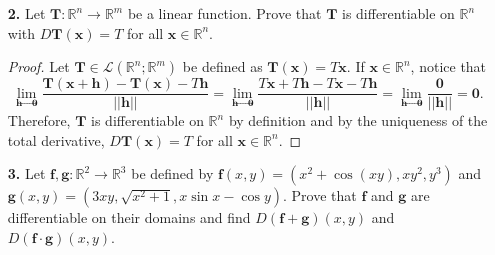 \documentclass[ 12pt ]{article}
\begin{document}
\begin{enumerate}
		\begin{proof}
			Let $f, g : \mathbb{R} \to \mathbb{R}$ be functions such that $f, g : \mathcal{C}^1(-1, 1)$. Furthermore, let $h(x, y) = f(x)g(y)$. For any $(x, y) \in (-1, 1)^2$, observe
			that $$\frac{\partial h}{\partial x}(x, y) = g(y) \frac{\partial f}{\partial x}(x)\;\;\; \mathrm{and}\;\;\; \frac{\partial h}{\partial y}(x, y) = f(x) \frac{\partial g}{
			\partial y}(y)$$ are both continuous as a result of our lemma and so $h \in \mathcal{C}^1(-1, 1)^2$. Then by Theorem 11.15, $h$ is differentiable on $(-1, 1)^2$.
		\end{proof}


	\item[\textbf{2.}] Let $\textbf{T} : \mathbb{R}^n \to \mathbb{R}^m$ be a linear function. Prove that $\textbf{T}$ is differentiable on $\mathbb{R}^n$ with $D\textbf{T}(\textbf{x}) =
		T$ for all $\textbf{x} \in \mathbb{R}^n$.

		\begin{proof}
			Let $\textbf{T} \in \mathcal{L}( \mathbb{R}^n; \mathbb{R}^m )$ be defined as $\textbf{T}(\textbf{x}) = T\textbf{x}$. If $\textbf{x} \in \mathbb{R}^n$, notice that
			$$\lim_{\textbf{h} \to \textbf{0}} \frac{\textbf{T}(\textbf{x} + \textbf{h}) - \textbf{T}(\textbf{x}) - T\textbf{h}}{||\textbf{h}||} = \lim_{\textbf{h} \to \textbf{0}}
			\frac{T\textbf{x} + T\textbf{h} - T\textbf{x} - T\textbf{h}}{||\textbf{h}||} = \lim_{\textbf{h} \to \textbf{0}} \frac{\textbf{0}}{||\textbf{h}||} = \textbf{0}.$$
			Therefore, $\textbf{T}$ is differentiable on $\mathbb{R}^n$ by definition and by the uniqueness of the total derivative, $D\textbf{T}(\textbf{x}) = T$ for all $\textbf{x}
			\in \mathbb{R}^n$.
		\end{proof}


		\item[\textbf{3.}] Let $\textbf{f}, \textbf{g} : \mathbb{R}^2 \to \mathbb{R}^3$ be defined by $\textbf{f}(x, y) = (x^2 + \cos(xy), xy^2, y^3)$ and $\textbf{g}(x, y) = \left (
			3xy, \sqrt{x^2 + 1}, x \sin x - \cos y \right )$. Prove that $\textbf{f}$ and $\textbf{g}$ are differentiable on their domains and find $D(\textbf{f} + \textbf{g})(x, y)$ and
			$D(\textbf{f} \cdot \textbf{g})(x, y)$.


\end{enumerate}
\end{document}
